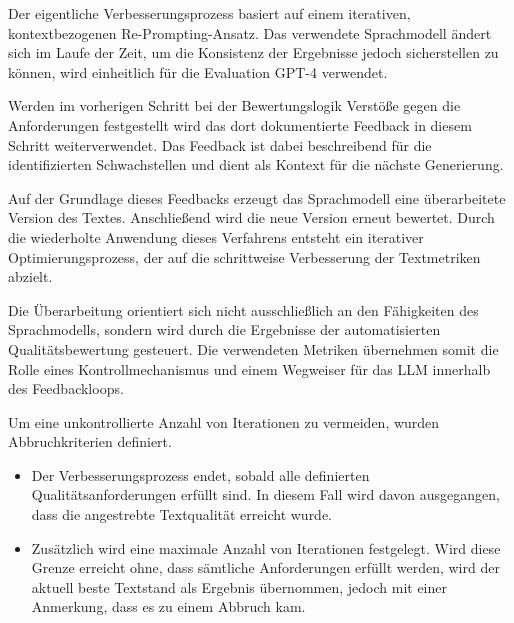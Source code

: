 
Der eigentliche Verbesserungsprozess basiert auf einem iterativen, kontextbezogenen Re-Prompting-Ansatz.
Das verwendete Sprachmodell ändert sich im Laufe der Zeit, um die Konsistenz der Ergebnisse jedoch sicherstellen zu können, wird einheitlich für die Evaluation GPT-4 verwendet.

Werden im vorherigen Schritt bei der Bewertungslogik Verstöße gegen die Anforderungen festgestellt wird das dort dokumentierte Feedback in diesem Schritt weiterverwendet.
Das Feedback ist dabei beschreibend für die identifizierten Schwachstellen und dient als Kontext für die nächste Generierung.

Auf der Grundlage dieses Feedbacks erzeugt das Sprachmodell eine überarbeitete Version des Textes.
Anschließend wird die neue Version erneut bewertet.
Durch die wiederholte Anwendung dieses Verfahrens entsteht ein iterativer Optimierungsprozess, der auf die schrittweise Verbesserung der Textmetriken abzielt.

Die Überarbeitung orientiert sich nicht ausschließlich an den Fähigkeiten des Sprachmodells, sondern wird durch die Ergebnisse der automatisierten Qualitätsbewertung gesteuert.
Die verwendeten Metriken übernehmen somit die Rolle eines Kontrollmechanismus und einem Wegweiser für das LLM innerhalb des Feedbackloops.

Um eine unkontrollierte Anzahl von Iterationen zu vermeiden, wurden Abbruchkriterien definiert.
\begin{itemize}
	\item Der Verbesserungsprozess endet, sobald alle definierten Qualitätsanforderungen erfüllt sind.
	In diesem Fall wird davon ausgegangen, dass die angestrebte Textqualität erreicht wurde.
	\item Zusätzlich wird eine maximale Anzahl von Iterationen festgelegt.
	Wird diese Grenze erreicht ohne, dass sämtliche Anforderungen erfüllt werden, wird der aktuell beste Textstand als Ergebnis übernommen, jedoch mit einer Anmerkung, dass es zu einem Abbruch kam.
\end{itemize}